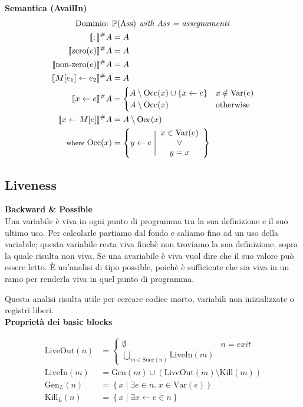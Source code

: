 \documentclass[a4paper,12pt,openany]{article}
\begin{document}
\noindent\textbf{Semantica (AvailIn)}
\begin{align*}
    \mbox{Dominio: }& \mathbb{P}(\mbox{Ass}) \textit{ with Ass = assegnamenti}\\
    \llbracket ; \rrbracket^\#A &= A\\
    \llbracket \mbox{zero}(e) \rrbracket^\#A &= A\\
    \llbracket \mbox{non-zero}(e) \rrbracket^\#A &= A\\
    \llbracket M[e_1]\leftarrow e_2 \rrbracket^\#A &= A\\
    \llbracket x \leftarrow e \rrbracket^\#A &=
    \begin{cases}
        A \setminus \mbox{Occ}(x) \cup \{x\leftarrow e\} & x\notin \mbox{Var}(e)\\
        A \setminus \mbox{Occ}(x) & \mbox{otherwise}
    \end{cases}\\
    \llbracket x\leftarrow M[e] \rrbracket^\#A &= A\setminus \mbox{Occ}(x)\\
    \mbox{{\footnotesize where} Occ}(x) &=
    \left\{
        y\leftarrow e \;\Bigg\vert
        \begin{array}{cc}
            x \in \mbox{Var}(e)\\
            \lor\\
            y=x
        \end{array}
    \right\}
\end{align*}


\clearpage
\subsection{Liveness}
\textbf{Backward \& Possible}\\[1em]
Una variabile è viva in ogni punto di programma tra la sua definizione e il suo ultimo uso. Per calcolarle partiamo dal fondo e saliamo fino ad un uso della variabile; questa variabile resta viva finchè non troviamo la sua definizione, sopra la quale risulta non viva. Se una avariabile è viva vuol dire che il suo valore può essere letto. È un'analisi di tipo possible, poichè è sufficiente che sia viva in un ramo per renderla viva in quel punto di programma.

Questa analisi risulta utile per cercare codice morto, variabili non inizializzate o registri liberi.\\[1em]

\noindent\textbf{Proprietà dei basic blocks}

\begin{align*}
\mbox{LiveOut}(n) &=
\begin{cases}
    \emptyset & n = exit\\
    \bigcup\limits_{m\in \mbox{Succ}(n)} \mbox{LiveIn}(m)
\end{cases}\\
\mbox{LiveIn}(m) &= \mbox{Gen}(m) \cup (\mbox{LiveOut}(m) \setminus \mbox{Kill}(m))\\
\mbox{Gen}_{L}(n) &= \left\{
x \;\big\vert\; \exists e \in n.\; x\in\mbox{Var}(e)
\right\}\\
\mbox{Kill}_{L}(n) &= \left\{
x \;\big\vert\; \exists x\leftarrow e \in n
\right\}
\end{align*}
\end{document}
